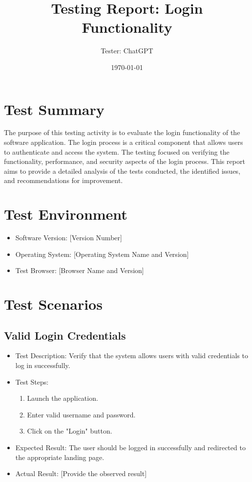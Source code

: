 \documentclass{article}
\begin{document}
\title{Testing Report: Login Functionality}
\date{\today}
\author{Tester: ChatGPT}

\maketitle

\section{Test Summary}
The purpose of this testing activity is to evaluate the login functionality of the software application. The login process is a critical component that allows users to authenticate and access the system. The testing focused on verifying the functionality, performance, and security aspects of the login process. This report aims to provide a detailed analysis of the tests conducted, the identified issues, and recommendations for improvement.

\section{Test Environment}
\begin{itemize}
  \item Software Version: [Version Number]
  \item Operating System: [Operating System Name and Version]
  \item Test Browser: [Browser Name and Version]
\end{itemize}

\section{Test Scenarios}

\subsection{Valid Login Credentials}
\begin{itemize}
  \item Test Description: Verify that the system allows users with valid credentials to log in successfully.
  \item Test Steps:
  \begin{enumerate}
    \item Launch the application.
    \item Enter valid username and password.
    \item Click on the "Login" button.
  \end{enumerate}
  \item Expected Result: The user should be logged in successfully and redirected to the appropriate landing page.
  \item Actual Result: [Provide the observed result]
\end{itemize}
\end{document}
